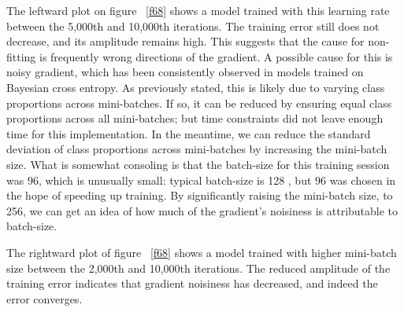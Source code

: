 \documentclass[a4paper,11pt]{article}
\begin{document}
The leftward plot on figure ~\ref{f68} shows a model trained with this learning rate between the 5,000th and 10,000th iterations. The training error still does not decrease, and its amplitude remains high. This suggests that the cause for non-fitting is frequently wrong directions of the gradient. A possible cause for this is noisy gradient, which has been consistently observed in models trained on Bayesian cross entropy. As previously stated, this is likely due to varying class proportions across mini-batches. If so, it can be reduced by ensuring equal class proportions across all mini-batches; but time constraints did not leave enough time for this implementation. In the meantime, we can reduce the standard deviation of class proportions across mini-batches by increasing the mini-batch size. What is somewhat consoling is that the batch-size for this training session was 96, which is unusually small: typical batch-size is 128 \cite{soumith-benchmark}, but 96 was chosen in the hope of speeding up training. By significantly raising the mini-batch size, to 256, we can get an idea of how much of the gradient's noisiness is attributable to batch-size.  

The rightward plot of figure ~\ref{f68} shows a model trained with higher mini-batch size between the 2,000th and 10,000th iterations. The reduced amplitude of the training error indicates that gradient noisiness has decreased, and indeed the error converges. 
\end{document}
